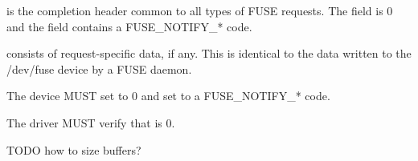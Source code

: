  is the completion header common to all types of FUSE requests.  The
 field is 0 and the  field contains a
FUSE_NOTIFY_* code.

 consists of request-specific data, if any.  This is identical
to the data written to the /dev/fuse device by a FUSE daemon.


The device MUST set  to 0 and set  to a FUSE_NOTIFY_* code.


The driver MUST verify that  is 0.

TODO how to size buffers?

